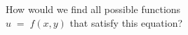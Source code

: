 \documentclass[preview]{standalone}
\begin{document}
\begin{center}
How would we find all possible functions \\$ u \;$$=\;$$f(x, y)$ that satisfy this equation?
\end{center}
\end{document}
